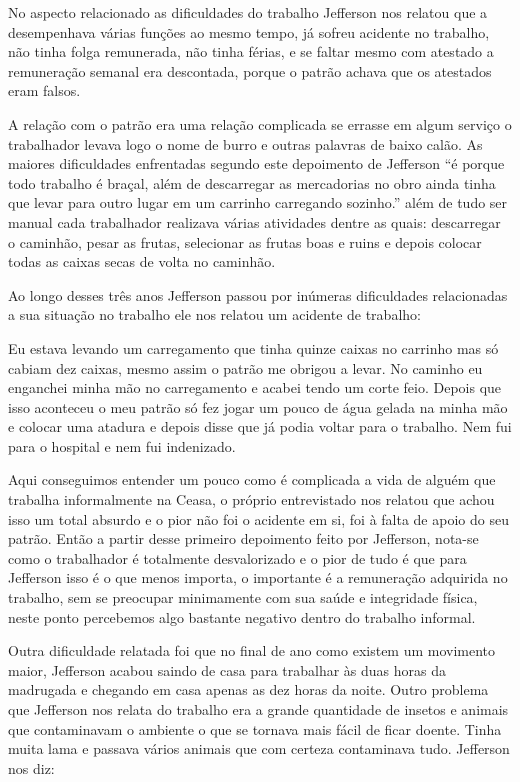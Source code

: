  No aspecto relacionado as dificuldades do trabalho Jefferson nos relatou que a desempenhava várias funções ao mesmo tempo, já sofreu acidente no trabalho, não tinha folga remunerada, não tinha férias, e se faltar mesmo com atestado a remuneração semanal era descontada, porque o patrão achava que os atestados eram falsos.
 
 A relação com o patrão era uma relação complicada se errasse em algum serviço o trabalhador levava logo o nome de burro e outras palavras de baixo calão. As maiores dificuldades enfrentadas segundo este depoimento de Jefferson ``é porque todo trabalho é braçal, além de descarregar as mercadorias no obro ainda tinha que levar para outro lugar em um carrinho carregando sozinho.'' além de tudo ser manual cada trabalhador realizava várias atividades dentre as quais: descarregar o caminhão, pesar as frutas, selecionar as frutas boas e ruins e depois colocar todas as caixas secas de volta no caminhão. 
 
 Ao longo desses três anos Jefferson passou por inúmeras dificuldades relacionadas a sua situação no trabalho ele nos relatou um acidente de trabalho: 
 
 \begin{citacao}
Eu estava levando um carregamento que tinha quinze caixas no carrinho mas só cabiam dez caixas, mesmo assim o patrão me obrigou a levar. No caminho eu enganchei minha mão no carregamento e acabei tendo um corte feio. Depois que isso aconteceu o meu patrão só fez jogar um pouco de água gelada na minha mão e colocar uma atadura e depois disse que já podia voltar para o trabalho. Nem fui para o hospital e nem fui indenizado.  
 \end{citacao}

Aqui conseguimos entender um pouco como é complicada a vida de alguém que trabalha informalmente na Ceasa, o próprio entrevistado nos relatou que achou isso um total absurdo e o pior não foi o acidente em si, foi à falta de apoio do seu patrão. Então a partir desse primeiro depoimento feito por Jefferson, nota-se como o trabalhador é totalmente desvalorizado e o pior de tudo é que para Jefferson isso é o que menos importa, o importante é a remuneração adquirida no trabalho, sem se preocupar minimamente com sua saúde e integridade física, neste ponto percebemos algo bastante negativo dentro do trabalho informal.

Outra dificuldade relatada foi que no final de ano como existem um movimento maior, Jefferson acabou saindo de casa para trabalhar às duas horas da madrugada e chegando em casa apenas as dez horas da noite.
Outro problema que Jefferson nos relata do trabalho era a grande quantidade de insetos e animais que contaminavam o ambiente o que se tornava mais fácil de ficar doente. Tinha muita lama e passava vários animais que com certeza contaminava tudo. Jefferson nos diz:

